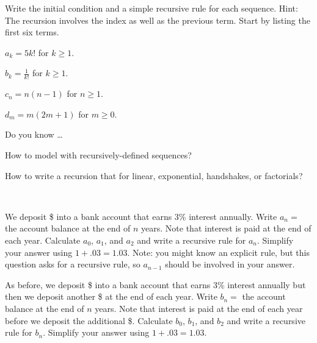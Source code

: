 \begin{exer}[\exerU] %
\label{exer_write_recursion_uses_index}
    Write the initial condition and a simple recursive rule for each sequence.  Hint: The recursion involves the index as well as the previous term.  Start by listing the first six terms.
        \begin{exerpart}
            \item $a_k = 5k!$ for $k \ge 1$.
            \item $b_k = \frac{1}{k!}$ for $k \ge 1$. 
            \item $c_n = n(n-1)$ for $n \ge 1$. 
            \item $d_m = m(2m+1)$ for $m \ge 0$.
        \end{exerpart}
\end{exer}

\begin{exer}[\exerR] %
\label{exer_dyk_next_term_rec}
    Do you know \ldots
        \begin{exerpart}
            \item How to model with recursively-defined sequences?
            \item How to write a recursion that for linear, exponential, handshakes, or factorials?
        \end{exerpart}
\end{exer}

\begin{exer}[\exerE] %
\label{exer_savings_annuity}
~     
    \begin{exerpart}
        \item \label{part_savings} We deposit \$ into a bank account that earns 3\% interest annually. Write $a_n=$ the account balance at the end of $n$ years. Note that interest is paid at the end of each year. Calculate $a_0$, $a_1$, and $a_2$ and write a recursive rule for $a_n$.  Simplify your answer using $1 + .03 = 1.03$.  Note:  you might know an explicit rule, but this question asks for a recursive rule, so $a_{n-1}$ should be involved in your answer.
        \item \label{part_annuity} As before, we deposit \$ into a bank account that earns 3\% interest annually but then we deposit another \$ at the end of each year.  Write $b_n=$ the account balance at the end of $n$ years. Note that interest is paid at the end of each year before we deposit the additional \$. Calculate $b_0$, $b_1$, and $b_2$ and write a recursive rule for $b_n$.  Simplify your answer using $1 + .03 = 1.03$.  
    \end{exerpart}
\end{exer}

